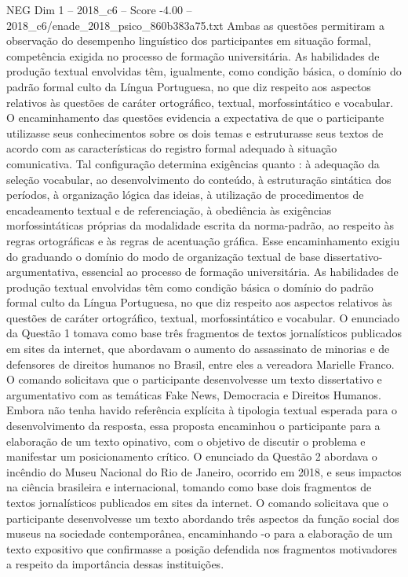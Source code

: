 \begin{textsample}{NEG Dim 1 – 2018\_c6 – Score -4.00 – 2018\_c6/enade\_2018\_psico\_860b383a75.txt}
Ambas as questões permitiram a observação do desempenho linguístico dos participantes em situação formal, competência exigida no processo de formação universitária.
As habilidades de produção textual envolvidas têm, igualmente, como condição básica, o domínio do padrão formal culto da Língua Portuguesa, no que diz respeito aos aspectos relativos às questões de caráter ortográfico, textual, morfossintático e vocabular.
O encaminhamento das questões evidencia a expectativa de que o participante utilizasse seus conhecimentos sobre os dois temas e estruturasse seus textos de acordo com as características do registro formal adequado à situação comunicativa.
Tal configuração determina exigências quanto : à adequação da seleção vocabular, ao desenvolvimento do conteúdo, à estruturação sintática dos períodos, à organização lógica das ideias, à utilização de procedimentos de encadeamento textual e de referenciação, à obediência às exigências morfossintáticas próprias da modalidade escrita da norma-padrão, ao respeito às regras ortográficas e às regras de acentuação gráfica.
Esse encaminhamento exigiu do graduando o domínio do modo de organização textual de base dissertativo-argumentativa, essencial ao processo de formação universitária.
As habilidades de produção textual envolvidas têm como condição básica o domínio do padrão formal culto da Língua Portuguesa, no que diz respeito aos aspectos relativos às questões de caráter ortográfico, textual, morfossintático e vocabular.
O enunciado da Questão 1 tomava como base três fragmentos de textos jornalísticos publicados em sites da internet, que abordavam o aumento do assassinato de minorias e de defensores de direitos humanos no Brasil, entre eles a vereadora Marielle Franco.
O comando solicitava que o participante desenvolvesse um texto dissertativo e argumentativo com as temáticas Fake News, Democracia e Direitos Humanos.
Embora não tenha havido referência explícita à tipologia textual esperada para o desenvolvimento da resposta, essa proposta encaminhou o participante para a elaboração de um texto opinativo, com o objetivo de discutir o problema e manifestar um posicionamento crítico.
O enunciado da Questão 2 abordava o incêndio do Museu Nacional do Rio de Janeiro, ocorrido em 2018, e seus impactos na ciência brasileira e internacional, tomando como base dois fragmentos de textos jornalísticos publicados em sites da internet.
O comando solicitava que o participante desenvolvesse um texto abordando três aspectos da função social dos museus na sociedade contemporânea, encaminhando -o para a elaboração de um texto expositivo que confirmasse a posição defendida nos fragmentos motivadores a respeito da importância dessas instituições.

\end{textsample}
